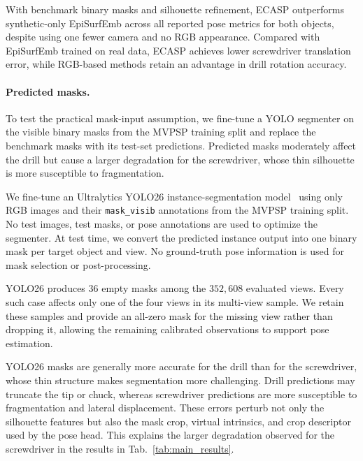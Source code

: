 With benchmark binary masks and silhouette refinement, ECASP outperforms synthetic-only EpiSurfEmb across all reported pose metrics for both objects, despite using one fewer camera and no RGB appearance.
Compared with EpiSurfEmb trained on real data, ECASP achieves lower screwdriver translation error, while RGB-based methods retain an advantage in drill rotation accuracy.

\paragraph{Predicted masks.}
To test the practical mask-input assumption, we fine-tune a YOLO segmenter on the visible binary masks from the MVPSP training split and replace the benchmark masks with its test-set predictions.
Predicted masks moderately affect the drill but cause a larger degradation for the screwdriver, whose thin silhouette is more susceptible to fragmentation.


\label{supp:predicted_masks}

We fine-tune an Ultralytics YOLO26 instance-segmentation
model~\cite{jocher2026yolo26} using only RGB images and their
\texttt{mask\_visib} annotations from the MVPSP training split.
No test images, test masks, or pose annotations are used to optimize the
segmenter.
At test time, we convert the predicted instance output into one binary mask
per target object and view. No ground-truth pose information is used for mask
selection or post-processing.

YOLO26 produces \(36\) empty masks among the \(352{,}608\) evaluated views.
Every such case affects only one of the four views in its multi-view sample.
We retain these samples and provide an all-zero mask for the missing view
rather than dropping it, allowing the remaining calibrated observations to
support pose estimation.

YOLO26 masks are generally more accurate for the drill than for the
screwdriver, whose thin structure makes segmentation more challenging.
Drill predictions may truncate the tip or chuck, whereas screwdriver
predictions are more susceptible to fragmentation and lateral displacement.
These errors perturb not only the silhouette features but also the mask crop,
virtual intrinsics, and crop descriptor used by the pose head.
This explains the larger degradation observed for the screwdriver in the
results in Tab.~\ref{tab:main_results}.

